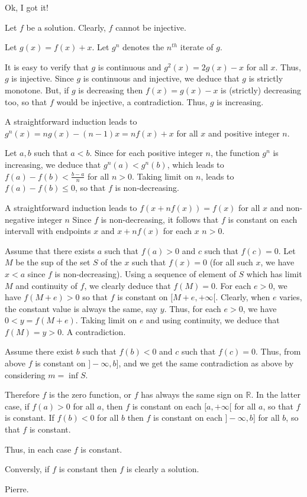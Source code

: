 \begin{solution}
	Ok, I got it!

Let $ f$ be a solution.
Clearly, $ f$ cannot be injective.

Let $ g(x)=f(x)+x$.
Let $ g^n$ denotes the $ n^{th}$ iterate of $ g$.

It is easy to verify that $ g$ is continuous and $ g^2(x)=2g(x)-x$ for all $ x$.
Thus, $ g$ is injective.
Since $ g$ is continuous and injective, we deduce that $ g$ is strictly monotone. But, if $ g$ is decreasing then $ f(x)=g(x)-x$ is (strictly) decreasing too, so that $ f$ would be injective, a contradiction.
Thus, $ g$ is increasing.

A straightforward induction leads to $ g^n(x) = ng(x)-(n-1)x = nf(x)+x$ for all $ x$ and positive integer $ n$.

Let $ a,b$ such that $ a<b$.
Since for each positive integer $ n$, the function $ g^n$ is increasing, we deduce that $ g^n(a) < g^n(b)$, which leads to $ f(a)-f(b) < \frac {b-a}{n}$ for all $ n>0$.
Taking limit on $ n$, leads to $ f(a)-f(b) \leq 0$, so that $ f$ is non-decreasing.

A straightforward induction leads to $ f(x+nf(x)) = f(x)$ for all $ x$ and non-negative integer $ n$
Since $ f$ is non-decreasing, it follows that $ f$ is constant on each intervall with endpoints $ x$ and $ x+nf(x)$ for each $ x$ $ n >0$.

Assume that there exists $ a$ such that $ f(a) > 0$ and $ c$ such that $ f(c)=0$.
Let $ M$ be the sup of the set $ S$ of the $ x$ such that $ f(x) =0$ (for all such $ x$, we have $ x < a$ since $ f$ is non-decreasing).
Using a sequence of element of $ S$ which has limit $ M$ and continuity of $ f$, we clearly deduce that $ f(M)=0$.
For each $ e>0$, we have $ f(M+e)>0$ so that $ f$ is constant on $ [M+e,+\infty[$. Clearly, when $ e$ varies, the constant value is always the same, say $ y$. Thus, for each $ e>0$, we have $ 0<y = f(M+e)$. Taking limit on $ e$ and using continuity, we deduce that $ f(M)=y >0$. A contradiction.

Assume there exist $ b$ such that $ f(b) < 0$ and $ c$ such that $ f(c)=0.$
Thus, from above $ f$ is constant on $ ]-\infty , b]$, and we get the same contradiction as above by considering $ m = \inf S$.

Therefore $ f$ is the zero function, or $ f$ has always the same sign on $ \mathbb{R}$.
In the latter case, if $ f(a) > 0$ for all $ a$, then $ f$ is constant on each $ [a, + \infty[$ for all $ a$, so that $ f$ is constant.
If $ f(b) < 0$ for all $ b$ then $ f$ is constant on each $ ]- \infty , b]$ for all $ b$, so that $ f$ is constant.

Thus, in each case $ f$ is constant.

Conversly, if $ f$ is constant then $ f$ is clearly a solution.

Pierre.
\end{solution}



